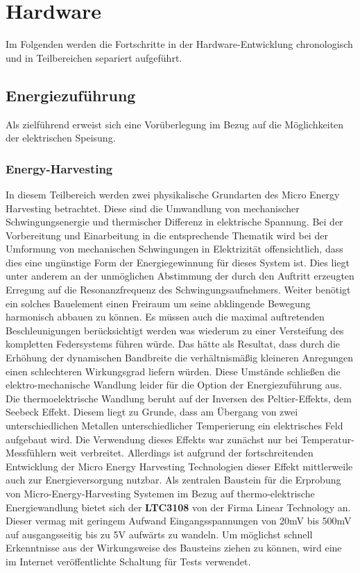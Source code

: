 \documentclass[11pt]{scrreprt} %
\begin{document}
\chapter{Hardware}
Im Folgenden werden die Fortschritte in der Hardware-Entwicklung chronologisch und in Teilbereichen separiert aufgeführt.
\section{Energiezuführung}
Als zielführend erweist sich eine Vorüberlegung im Bezug auf die Möglichkeiten der elektrischen Speisung.
\subsection{Energy-Harvesting}
In diesem Teilbereich werden zwei physikalische Grundarten des Micro Energy Harvesting betrachtet. Diese sind die Umwandlung von mechanischer Schwingungsenergie und thermischer Differenz in elektrische Spannung. Bei der Vorbereitung und Einarbeitung in die entsprechende Thematik wird bei der Umformung von mechanischen Schwingungen in Elektrizität offensichtlich, dass dies eine ungünstige Form der Energiegewinnung für dieses System ist. Dies liegt unter anderem an der unmöglichen Abstimmung der durch den Auftritt erzeugten Erregung auf die Resonanzfrequenz des Schwingungsaufnehmers. Weiter benötigt ein solches Bauelement einen Freiraum um seine abklingende Bewegung harmonisch abbauen zu können. Es müssen auch die maximal auftretenden Beschleunigungen berücksichtigt werden was wiederum zu einer Versteifung des kompletten Federsystems führen würde. Das hätte als Resultat, dass durch die Erhöhung der dynamischen Bandbreite die verhältnismäßig kleineren Anregungen einen schlechteren Wirkungsgrad liefern würden. Diese Umstände schließen die elektro-mechanische Wandlung leider für die Option der Energiezuführung aus. \newline %
Die thermoelektrische Wandlung beruht auf der Inversen des Peltier-Effekts, dem Seebeck Effekt. Diesem liegt zu Grunde, dass am Übergang von zwei unterschiedlichen Metallen unterschiedlicher Temperierung ein elektrisches Feld aufgebaut wird. Die Verwendung dieses Effekts war zunächst nur bei Temperatur-Messfühlern weit verbreitet. Allerdings ist aufgrund der fortschreitenden Entwicklung der Micro Energy Harvesting Technologien dieser Effekt mittlerweile auch zur Energieversorgung nutzbar. \newline \newline
Als zentralen Baustein für die Erprobung von Micro-Energy-Harvesting Systemen im Bezug auf thermo-elektrische Energiewandlung bietet sich der \textbf{LTC3108} von der Firma Linear Technology an. Dieser vermag mit geringem Aufwand Eingangsspannungen von 20mV bis 500mV auf ausgangsseitig bis zu 5V aufwärts zu wandeln. Um möglichst schnell Erkenntnisse aus der Wirkungsweise des Bausteins ziehen zu können, wird eine im Internet veröffentlichte Schaltung für Tests verwendet. 



\end{document}
